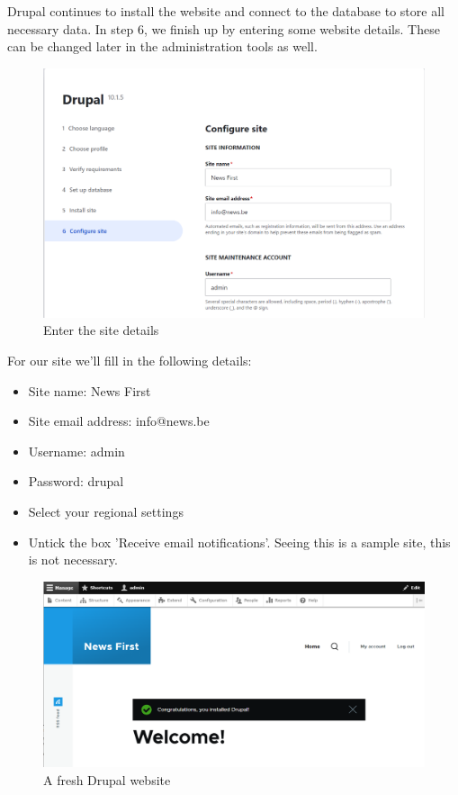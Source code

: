 Drupal continues to install the website and connect to the database to store all necessary data. In step 6, we finish up by entering some website details. These can be changed later in the administration tools as well.

\begin{figure}[h]
    \centering
    \includegraphics[width=1\linewidth]{img/ch3/install_step6}
    \caption{Enter the site details}
    \label{fig:install_step6}
\end{figure}

For our site we'll fill in the following details:
\begin{itemize}
    \item Site name: News First
    \item Site email address: info@news.be
    \item Username: admin
    \item Password: drupal
    \item Select your regional settings
    \item Untick the box 'Receive email notifications'. Seeing this is a sample site, this is not necessary.
\end{itemize}


\begin{figure}[h]
    \centering
    \includegraphics[width=1\linewidth]{img/ch3/install_complete}
    \caption{A fresh Drupal website}
    \label{fig:install_complete}
\end{figure}

